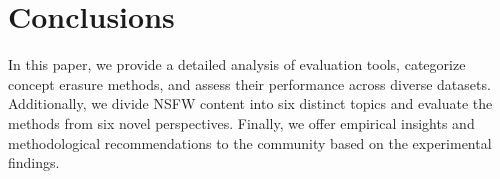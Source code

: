 \section{Conclusions}
In this paper, we provide a detailed analysis of evaluation tools, categorize concept erasure methods, and assess their performance across diverse datasets. Additionally, we divide NSFW content into six distinct topics and evaluate the methods from six novel perspectives. Finally, we offer empirical insights and methodological recommendations to the community based on the experimental findings.